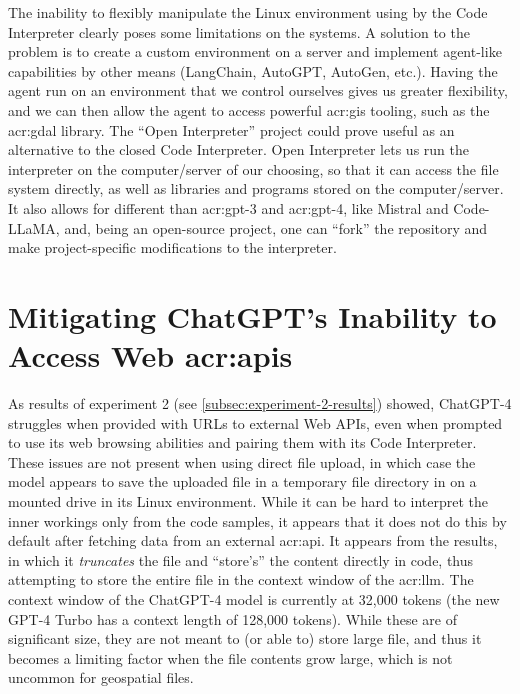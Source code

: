 The inability to flexibly manipulate the Linux environment using by the Code Interpreter clearly poses some limitations on the systems. A solution to the problem is to create a custom environment on a server and implement agent-like capabilities by other means (LangChain, AutoGPT, AutoGen, etc.). Having the agent run on an environment that we control ourselves gives us greater flexibility, and we can then allow the agent to access powerful \acrshort{acr:gis} tooling, such as the \acrshort{acr:gdal} library. The \enquote{Open Interpreter} project \citep{killianlucasKillianLucasOpeninterpreter2023} could prove useful as an alternative to the closed Code Interpreter. Open Interpreter lets us run the interpreter on the computer/server of our choosing, so that it can access the file system directly, as well as libraries and programs stored on the computer/server. It also allows for different  than \acrshort{acr:gpt}-3 and \acrshort{acr:gpt}-4, like Mistral  and Code-LLaMA, and, being an open-source project, one can \enquote{fork} the repository and make project-specific modifications to the interpreter.

\section[Mitigating ChatGPT's Inability to Access Web APIs]{Mitigating ChatGPT's Inability to Access Web \acrshort{acr:api}s}\label{sec:api-access-discussion}

As results of experiment 2 (see \autoref{subsec:experiment-2-results}) showed, ChatGPT-4 struggles when provided with URLs to external Web APIs, even when prompted to use its web browsing abilities and pairing them with its Code Interpreter. These issues are not present when using direct file upload, in which case the model appears to save the uploaded file in a temporary file directory in on a mounted drive in its Linux environment. While it can be hard to interpret the inner workings only from the code samples, it appears that it does not do this by default after fetching data from an external \acrshort{acr:api}. It appears from the results, in which it \textit{truncates} the file and \enquote{store's} the content directly in code, thus attempting to store the entire file in the context window of the  \acrshort{acr:llm}. The context window of the ChatGPT-4 model is currently at 32,000 tokens (the new GPT-4 Turbo has a context length of 128,000 tokens). While these are of significant size, they are not meant to (or able to) store large file, and thus it becomes a limiting factor when the file contents grow large, which is not uncommon for geospatial files.


